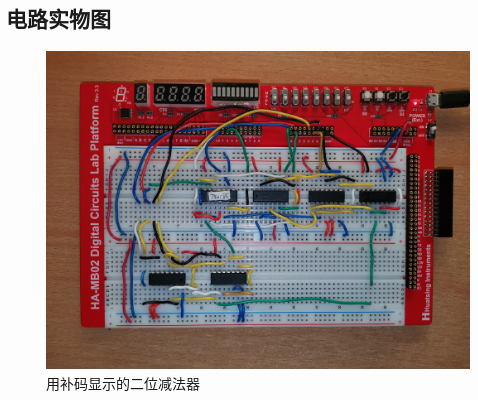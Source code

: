 \documentclass[UTF8]{ctexart}
\begin{document}
{\subsection{电路实物图}
\begin{figure}[H]\centering
    {
        \includegraphics[scale=0.08]{10.jpg}
        \caption{用补码显示的二位减法器}
    }
\end{figure}\par
\vspace{-2em}

}
\end{document}

